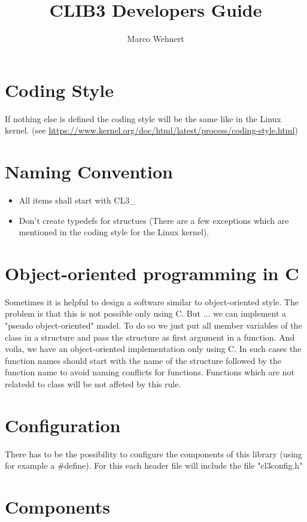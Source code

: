 \documentclass{stddoc}
\title{CLIB3 Developers Guide}
\author{Marco Wehnert}
\begin{document}
\maketitle

\section{Coding Style}
	If nothing else is defined the coding style will be the same like
	in the Linux kernel. (see \url{https://www.kernel.org/doc/html/latest/process/coding-style.html})


\section{Naming Convention}

	\begin{itemize}
		\item All items shall start with CL3\_
		\item Don't create typedefs for structues (There are a few exceptions
			which are mentioned in the coding style for the Linux kernel).
	\end{itemize}


\section{Object-oriented programming in C}
	Sometimes it is helpful to design a software similar to object-oriented
	style. The problem is that this is not possible only using C. But ...
	we can implement a "pseudo object-oriented" model. To do so we
	just put all member variables of the class in a structure and pass
	the structure as first argument in a function. And voila, we have
	an object-oriented implementation only using C.
	In such cases the function names should
	start with the name of the structure followed by the function name
	to avoid naming conflicts for functions.
	Functions which are not relatedd to class will be not affeted by this
	rule.


\section{Configuration}
	There has to be the possibility to configure the components of this
	library (using for example a \#define). For this each header file will
	include the file "cl3config.h"

\section{Components}
\end{document}
